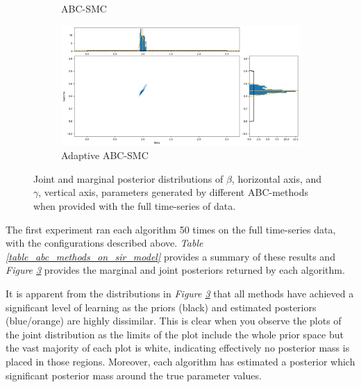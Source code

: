 \documentclass[11pt,a4paper]{article}
\theoremstyle{break}
\begin{document}
\begin{figure}[H]
{\begin{subfigure}{.45\paperwidth}
        \caption{ABC-SMC}
        \label{fig_joint_distribution_full_time_series_smc}
      \end{subfigure}
      \begin{subfigure}{.45\paperwidth}
        \centering
        \includegraphics[width=\textwidth]{abc_adaptive_smc_joint_posterior_sir.PNG}
        \caption{Adaptive ABC-SMC}
        \label{fig_joint_distribution_full_time_series_adaptive_smc}
      \end{subfigure}
    }
    \caption{Joint and marginal posterior distributions of $\beta$, horizontal axis, and $\gamma$, vertical axis, parameters generated by different ABC-methods when provided with the full time-series of data.}
    \label{fig_joint_distribution_full_time_series}
  \end{figure}

  The first experiment ran each algorithm 50 times on the full time-series data, with the configurations described above. \textit{Table \ref{table_abc_methods_on_sir_model}} provides a summary of these results and \textit{Figure \ref{fig_joint_distribution_full_time_series}} provides the marginal and joint posteriors returned by each algorithm.

  \par It is apparent from the distributions in \textit{Figure \ref{fig_joint_distribution_full_time_series}} that all methods have achieved a significant level of learning as the priors (black) and estimated posteriors (blue/orange) are highly dissimilar. This is clear when you observe the plots of the joint distribution as the limits of the plot include the whole prior space but the vast majority of each plot is white, indicating effectively no posterior mass is placed in those regions. Moreover, each algorithm has estimated a posterior which significant posterior mass around the true parameter values.
\end{document}
